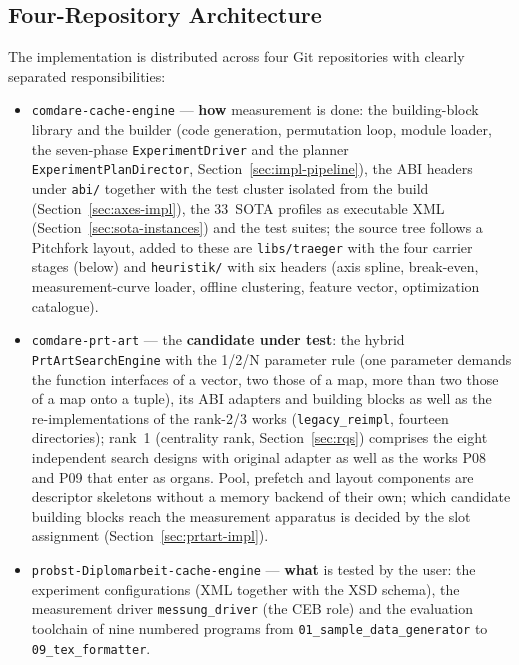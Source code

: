 \begin{nurkurz}
\section{Four-Repository Architecture}\label{sec:repos}
The implementation is distributed across four Git repositories with clearly separated responsibilities:
\begin{itemize}
  \item \texttt{comdare-cache-engine} --- \textbf{how} measurement is done: the building-block library
  and the builder (code generation, permutation loop, module loader, the seven-phase
  \texttt{ExperimentDriver} and the planner \texttt{ExperimentPlanDirector},
  Section~\ref{sec:impl-pipeline}), the ABI headers under \texttt{abi/} together with the test cluster
  isolated from the build (Section~\ref{sec:axes-impl}), the 33~SOTA profiles as executable XML
  (Section~\ref{sec:sota-instances}) and the test suites; the source tree follows a Pitchfork layout,
  added to these are \texttt{libs/traeger} with the four carrier stages (below) and \texttt{heuristik/}
  with six headers (axis spline, break-even, measurement-curve loader, offline clustering, feature
  vector, optimization catalogue).
  \item \texttt{comdare-prt-art} --- the \textbf{candidate under test}: the hybrid
  \texttt{PrtArtSearchEngine} with the 1/2/N parameter rule (one parameter demands the function
  interfaces of a vector, two those of a map, more than two those of a map onto a tuple), its ABI
  adapters and building blocks as well as the re-implementations of the rank-2/3 works
  (\texttt{legacy\_\allowbreak{}reimpl}, fourteen directories); rank~1 (centrality rank,
  Section~\ref{sec:rqs}) comprises the eight independent search designs with original adapter as well as
  the works P08 and P09 that enter as organs. Pool, prefetch and layout components are descriptor
  skeletons without a memory backend of their own; which candidate building blocks reach the measurement
  apparatus is decided by the slot assignment (Section~\ref{sec:prtart-impl}).
  \item \texttt{probst-Diplomarbeit-cache-engine} --- \textbf{what} is tested by the user: the
  experiment configurations (XML together with the XSD schema), the measurement driver
  \texttt{messung\_driver} (the CEB role) and the evaluation toolchain of nine numbered programs from
  \texttt{01\_\allowbreak{}sample\_\allowbreak{}data\_\allowbreak{}generator} to
  \texttt{09\_\allowbreak{}tex\_\allowbreak{}formatter}.

\end{itemize}
\end{nurkurz}
